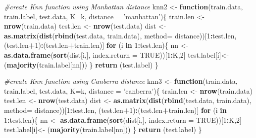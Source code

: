 \documentclass[
]{article}
\newenvironment{Shaded}{\begin{snugshade}}{\end{snugshade}}
\newcommand{\CommentTok}[1]{\textcolor[rgb]{0.56,0.35,0.01}{\textit{#1}}}
\newcommand{\ControlFlowTok}[1]{\textcolor[rgb]{0.13,0.29,0.53}{\textbf{#1}}}
\newcommand{\DataTypeTok}[1]{\textcolor[rgb]{0.13,0.29,0.53}{#1}}
\newcommand{\DecValTok}[1]{\textcolor[rgb]{0.00,0.00,0.81}{#1}}
\newcommand{\KeywordTok}[1]{\textcolor[rgb]{0.13,0.29,0.53}{\textbf{#1}}}
\newcommand{\NormalTok}[1]{#1}
\newcommand{\OperatorTok}[1]{\textcolor[rgb]{0.81,0.36,0.00}{\textbf{#1}}}
\newcommand{\OtherTok}[1]{\textcolor[rgb]{0.56,0.35,0.01}{#1}}
\newcommand{\StringTok}[1]{\textcolor[rgb]{0.31,0.60,0.02}{#1}}
\begin{document}
\begin{Shaded}
\begin{Highlighting}[]
\CommentTok{#create Knn function using Manhattan distance }
\NormalTok{knn2 <-}\StringTok{ }\ControlFlowTok{function}\NormalTok{(train.data, train.label, test.data, }\DataTypeTok{K=}\NormalTok{k, }\DataTypeTok{distance =} \StringTok{'manhattan'}\NormalTok{)\{}
\NormalTok{    train.len <-}\StringTok{ }\KeywordTok{nrow}\NormalTok{(train.data)}
\NormalTok{    test.len <-}\StringTok{ }\KeywordTok{nrow}\NormalTok{(test.data)}
\NormalTok{    dist <-}\StringTok{ }\KeywordTok{as.matrix}\NormalTok{(}\KeywordTok{dist}\NormalTok{(}\KeywordTok{rbind}\NormalTok{(test.data, train.data), }\DataTypeTok{method=}\NormalTok{ distance))[}\DecValTok{1}\OperatorTok{:}\NormalTok{test.len, (test.len}\OperatorTok{+}\DecValTok{1}\NormalTok{)}\OperatorTok{:}\NormalTok{(test.len}\OperatorTok{+}\NormalTok{train.len)]}
    \ControlFlowTok{for}\NormalTok{ (i }\ControlFlowTok{in} \DecValTok{1}\OperatorTok{:}\NormalTok{test.len)\{}
\NormalTok{        nn <-}\StringTok{ }\KeywordTok{as.data.frame}\NormalTok{(}\KeywordTok{sort}\NormalTok{(dist[i,], }\DataTypeTok{index.return =} \OtherTok{TRUE}\NormalTok{))[}\DecValTok{1}\OperatorTok{:}\NormalTok{K,}\DecValTok{2}\NormalTok{]}
\NormalTok{        test.label[i]<-}\StringTok{ }\NormalTok{(}\KeywordTok{majority}\NormalTok{(train.label[nn]))}
\NormalTok{    \}}
    \KeywordTok{return}\NormalTok{ (test.label)}
\NormalTok{\}}
\end{Highlighting}
\end{Shaded}

\begin{Shaded}
\begin{Highlighting}[]
\CommentTok{#create Knn function using Canberra distance }
\NormalTok{knn3 <-}\StringTok{ }\ControlFlowTok{function}\NormalTok{(train.data, train.label, test.data, }\DataTypeTok{K=}\NormalTok{k, }\DataTypeTok{distance =} \StringTok{'canberra'}\NormalTok{)\{}
\NormalTok{    train.len <-}\StringTok{ }\KeywordTok{nrow}\NormalTok{(train.data)}
\NormalTok{    test.len <-}\StringTok{ }\KeywordTok{nrow}\NormalTok{(test.data)}
\NormalTok{    dist <-}\StringTok{ }\KeywordTok{as.matrix}\NormalTok{(}\KeywordTok{dist}\NormalTok{(}\KeywordTok{rbind}\NormalTok{(test.data, train.data), }\DataTypeTok{method=}\NormalTok{ distance))[}\DecValTok{1}\OperatorTok{:}\NormalTok{test.len, (test.len}\OperatorTok{+}\DecValTok{1}\NormalTok{)}\OperatorTok{:}\NormalTok{(test.len}\OperatorTok{+}\NormalTok{train.len)]}
    \ControlFlowTok{for}\NormalTok{ (i }\ControlFlowTok{in} \DecValTok{1}\OperatorTok{:}\NormalTok{test.len)\{}
\NormalTok{        nn <-}\StringTok{ }\KeywordTok{as.data.frame}\NormalTok{(}\KeywordTok{sort}\NormalTok{(dist[i,], }\DataTypeTok{index.return =} \OtherTok{TRUE}\NormalTok{))[}\DecValTok{1}\OperatorTok{:}\NormalTok{K,}\DecValTok{2}\NormalTok{]}
\NormalTok{        test.label[i]<-}\StringTok{ }\NormalTok{(}\KeywordTok{majority}\NormalTok{(train.label[nn]))}
\NormalTok{    \}}
    \KeywordTok{return}\NormalTok{ (test.label)}
\NormalTok{\}}
\end{Highlighting}
\end{Shaded}
\end{document}
